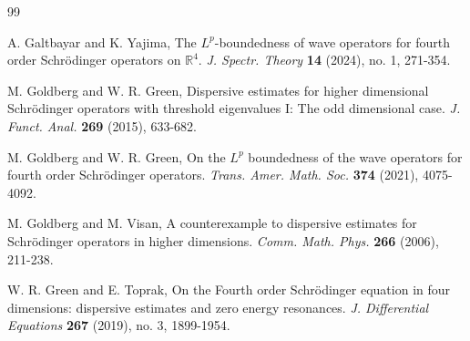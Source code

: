 \documentclass[11pt,reqno]{amsart}
\numberwithin{equation}{section}
\theoremstyle{definition}
\begin{document}
\begin{thebibliography}{99}

 A.  Galtbayar and K. Yajima,  The $L^p$-boundedness of wave operators for fourth order Schr\"{o}dinger operators on $\mathbb{R}^4$. \emph{J. Spectr. Theory} \textbf{14} (2024), no. 1, 271-354.

 M. Goldberg  and  W. R. Green, Dispersive estimates for higher dimensional Schr\"{o}dinger operators with threshold eigenvalues I: The odd dimensional case. \textit{J. Funct. Anal.} \textbf{269} (2015), 633-682.

 M. Goldberg  and  W. R. Green, On the $L^p$ boundedness of the wave operators for fourth order Schr\"{o}dinger operators. \emph{Trans. Amer. Math. Soc.} \textbf{374} (2021), 4075-4092.



  M. Goldberg and M. Visan, A counterexample to dispersive estimates for Schr\"{o}dinger operators in higher dimensions. \textit{Comm. Math. Phys.} \textbf{266} (2006), 211-238.

 W. R. Green and  E. Toprak, On the Fourth order Schr\"{o}dinger equation in four dimensions: dispersive estimates and zero energy resonances. \emph{J. Differential Equations} \textbf{267} (2019), no. 3, 1899-1954.





%
%









\end{thebibliography}
\end{document}

